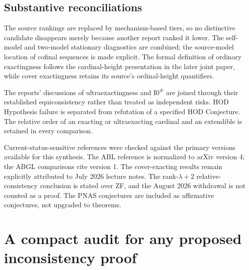 \documentclass[11pt,letterpaper]{article}
\theoremstyle{definition}
\newcommand{\Isharp}{\mathrm{I0}^{\#}}
\begin{document}
\subsection{Substantive reconciliations}

The source rankings are replaced by mechanism-based tiers, so no distinctive candidate disappears merely because another report ranked it lower. The self-model and two-model stationary diagnostics are combined; the source-model location of cofinal sequences is made explicit. The formal definition of ordinary exactingness follows the cardinal-height presentation in the later joint paper, while cover exactingness retains its source's ordinal-height quantifiers.

The reports' discussions of ultraexactingness and $\Isharp$ are joined through their established equiconsistency rather than treated as independent risks. HOD Hypothesis failure is separated from refutation of a specified HOD Conjecture. The relative order of an exacting or ultraexacting cardinal and an extendible is retained in every comparison.

Current-status-sensitive references were checked against the primary versions available for this synthesis. The ABL reference is normalized to arXiv version 4; the ABGL comparisons cite version 1. The cover-exacting results remain explicitly attributed to July 2026 lecture notes. The rank-$\lambda+2$ relative-consistency conclusion is stated over ZF, and the August 2026 withdrawal is not counted as a proof. The PNAS conjectures are included as affirmative conjectures, not upgraded to theorems.

\clearpage
\section{A compact audit for any proposed inconsistency proof}\label{app:audit}
\end{document}

